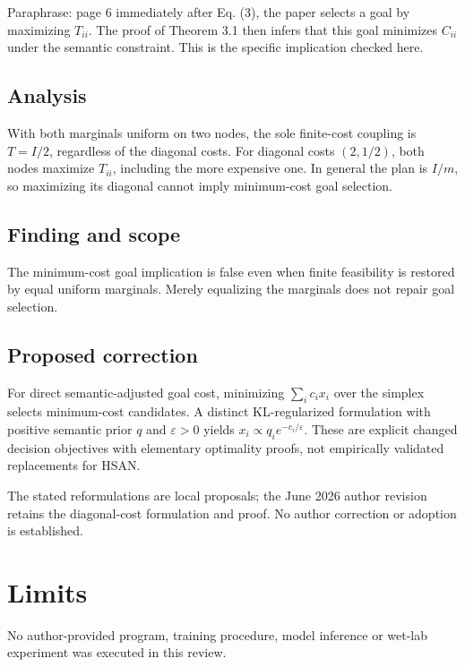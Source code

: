 \documentclass[11pt]{article}
\begin{document}
Paraphrase: page 6 immediately after Eq. (3), the paper selects a goal by maximizing \(T_{ii}\). The proof of Theorem 3.1 then infers that this goal minimizes \(C_{ii}\) under the semantic constraint. This is the specific implication checked here.

\subsection*{Analysis}

With both marginals uniform on two nodes, the sole finite-cost coupling is \(T=I/2\), regardless of the diagonal costs. For diagonal costs \((2,1/2)\), both nodes maximize \(T_{ii}\), including the more expensive one. In general the plan is \(I/m\), so maximizing its diagonal cannot imply minimum-cost goal selection.

\subsection*{Finding and scope}

The minimum-cost goal implication is false even when finite feasibility is restored by equal uniform marginals. Merely equalizing the marginals does not repair goal selection.

\subsection*{Proposed correction}

For direct semantic-adjusted goal cost, minimizing \(\sum_i c_ix_i\) over the simplex selects minimum-cost candidates. A distinct KL-regularized formulation with positive semantic prior \(q\) and \(\varepsilon>0\) yields \(x_i\propto q_i e^{-c_i/\varepsilon}\). These are explicit changed decision objectives with elementary optimality proofs, not empirically validated replacements for HSAN.

The stated reformulations are local proposals; the June 2026 author revision retains the diagonal-cost formulation and proof. No author correction or adoption is established.

\section*{Limits}

No author-provided program, training procedure, model inference or wet-lab experiment was executed in this review.\par
\end{document}
